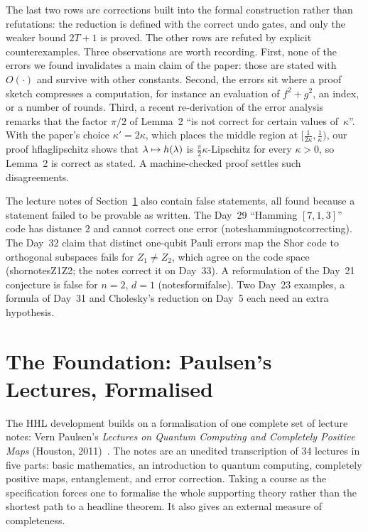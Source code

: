 \documentclass[runningheads]{llncs}
\let\ket\relax\let\bra\relax\let\braket\relax\let\ketbra\relax
\newcommand{\ket}[1]{|#1\rangle}
\newcommand{\bra}[1]{\langle #1|}
\newcommand{\braket}[2]{\langle #1|#2\rangle}
\newcommand{\ketbra}[2]{|#1\rangle\langle #2|}
\DeclareRobustCommand{\isa}[1]{\textsf{\def\_{\char95\allowbreak}#1}}
\begin{document}
The last two rows are corrections built into the formal construction rather than refutations: the
reduction is defined with the correct undo gates, and only the weaker bound $2T+1$ is proved. The other
rows are refuted by explicit counterexamples. Three observations are worth recording. First, none of
the errors we found invalidates a main claim of the paper: those are stated with $O(\cdot)$ and survive
with other constants.
Second, the errors sit where a proof sketch compresses a computation, for instance an evaluation of
$f^2+g^2$, an index, or a number of rounds. Third, a recent re-derivation of the error
analysis~\cite{liphillips2024} remarks that the factor $\pi/2$ of Lemma~2 ``is not correct for certain
values of~$\kappa$''. With the paper's choice $\kappa'=2\kappa$, which places the middle region at $[\frac1{2\kappa},\frac1\kappa)$,
our proof \isa{hflag\_lipschitz} shows that $\lambda\mapsto\ket{h(\lambda)}$ is
$\frac\pi2\kappa$-Lipschitz for every $\kappa>0$, so Lemma~2 is correct as stated. A machine-checked
proof settles such disagreements.

The lecture notes of Section~\ref{sec:paulsen} also contain false statements, all found because a
statement failed to be provable as written. The Day~29 ``Hamming $[7,1,3]$'' code has distance $2$ and
cannot correct one error (\isa{notes\_hamming\_not\_correcting}). The Day~32 claim that distinct
one-qubit Pauli errors map the Shor code to orthogonal subspaces fails for $Z_1\neq Z_2$, which agree on
the code space (\isa{shor\_notes\_Z1\_Z2}; the notes correct it on Day~33). A reformulation of the Day~21
conjecture is false for $n=2$, $d=1$ (\isa{notes\_form\_i\_false}). Two Day~23 examples, a formula of
Day~31 and Cholesky's reduction on Day~5 each need an extra hypothesis.
\section{The Foundation: Paulsen's Lectures, Formalised}\label{sec:paulsen}

The HHL development builds on a formalisation of one complete set of lecture notes: Vern Paulsen's
\emph{Lectures on Quantum Computing and Completely Positive Maps} (Houston, 2011)~\cite{paulsen2011notes}.
The notes are an unedited transcription of 34 lectures in five parts: basic mathematics, an introduction
to quantum computing, completely positive maps, entanglement, and error correction. Taking a course as
the specification forces one to formalise the whole supporting theory rather than the shortest path to
a headline theorem. It also gives an external measure of completeness.
\end{document}
